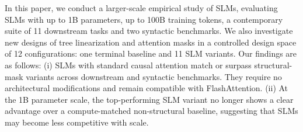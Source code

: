 \documentclass[11pt]{article}
\begin{document}
In this paper, we conduct a larger-scale empirical study of SLMs, evaluating SLMs with up to 1B parameters, up to 100B training tokens, a contemporary suite of 11 downstream tasks and two syntactic benchmarks. We also investigate new designs of tree linearization and attention masks in a controlled design space of 12 configurations: one terminal baseline and 11 SLM variants.
%
Our findings are as follows: (i) SLMs with standard causal attention match or surpass structural-mask variants across downstream and syntactic benchmarks. They require no architectural modifications and remain compatible with FlashAttention. (ii) At the 1B parameter scale, the top-performing SLM variant no longer shows a clear advantage over a compute-matched non-structural baseline, suggesting that SLMs may become less competitive with scale.
\end{document}

